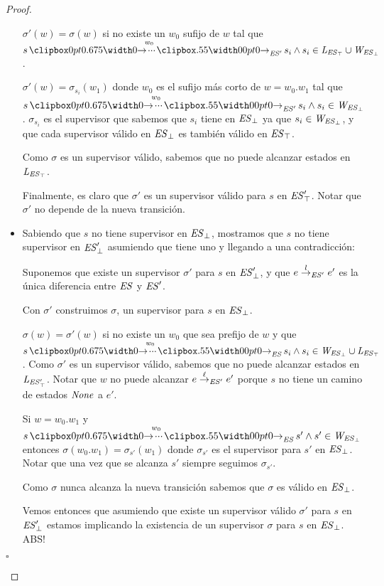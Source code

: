 \begin{proof}
\begin{itemize}
	$\sigma'(w) = \sigma(w)$ si no existe un $w_0$ sufijo de $w$ tal que $ s \runw{w_0}{\structure'} s_i \wedge s_i \in \LES \cup \WES$. 
	
	$\sigma'(w) = \sigma_{s_i}(w_1)$ donde $w_0$ es el sufijo más corto de $w = w_0.w_1$ tal que $ s \runw{w_0}{\structure'} s_i \wedge s_i \in \WES$. $\sigma_{s_i}$ es el supervisor que sabemos que  $s_i$ tiene en $\mathit{\mathit{ES}_{\bot}}$ ya que $s_i \in \mathit{W_{\mathit{\mathit{ES}_{\bot}}}}$, y que cada supervisor válido en $\mathit{\mathit{ES}_{\bot}}$ es también válido en $\mathit{\mathit{ES}_{\top}}$.
	
	Como $\sigma$ es un supervisor válido, sabemos que no puede alcanzar estados en $\mathit{L_{\mathit{\mathit{ES}_{\top}}}}$.
	
	Finalmente, es claro que $\sigma'$ es un supervisor válido para $s$ en $\mathit{\mathit{ES}'_{\top}}$. Notar que $\sigma'$ no depende de la nueva transición.
	
	
	
	
	\item Sabiendo que $s$ no tiene supervisor en $\mathit{\mathit{ES}_{\bot}}$, mostramos que $s$ no tiene supervisor en $\mathit{\mathit{ES}'_{\bot}}$ asumiendo que tiene uno y llegando a una contradicción:
	
	Suponemos que existe un supervisor $\sigma'$ para $s$ en $\mathit{\mathit{ES}'_{\bot}}$, y que $e \overset{l}{\rightarrow}_{\mathit{ES}'} e'$ es la única diferencia entre $\mathit{ES}$ y $\mathit{ES}'$.
	
	Con $\sigma'$ construimos $\sigma$, un supervisor para $s$ en $\mathit{\mathit{ES}_{\bot}}$.
	
	$\sigma(w) = \sigma'(w)$ si no existe un $w_0$ que sea prefijo de $w$ y que $s \runw{w_0}{\structure} s_i \wedge s_i \in \WES \cup \LES$. Como $\sigma'$ es un supervisor válido, sabemos que no puede alcanzar estados en $\mathit{L_{\mathit{\mathit{ES}'_{\top}}}}$. Notar que $w$ no puede alcanzar $e \overset{\ell}{\rightarrow}_{\mathit{ES}'} e'$ porque $s$ no tiene un camino de estados $\mathit{None}$ a $e'$.
	
	Si $w=w_0.w_1$ y $s \runw{w_0}{\structure} s' \wedge s' \in \WES$ entonces $\sigma(w_0.w_1) = \sigma_{s'}(w_1)$ donde $\sigma_{s'}$ es el supervisor para $s'$ en $\mathit{\mathit{ES}_{\bot}}$. Notar que una vez que se alcanza $s'$ siempre seguimos $\sigma_{s'}$.
	
	Como $\sigma$ nunca alcanza la nueva transición sabemos que $\sigma$ es válido en $\mathit{\mathit{ES}_{\bot}}$.
		
	Vemos entonces que asumiendo que existe un supervisor válido $\sigma'$ para $s$ en $\mathit{\mathit{ES}'_{\bot}}$ estamos implicando la existencia de un supervisor $\sigma$ para $s$ en $\mathit{\mathit{ES}_{\bot}}$. ABS! \\
	
\end{itemize}
\begin{flushright}
	$\square$
\end{flushright}
\end{proof}

